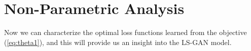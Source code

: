 %
%
%
%
%
%
%
%




\section{Non-Parametric Analysis}\label{sec:nonparam}
Now we can characterize the optimal loss functions learned from the objective (\ref{eq:theta1}), and this will provide us an insight into the LS-GAN model.

